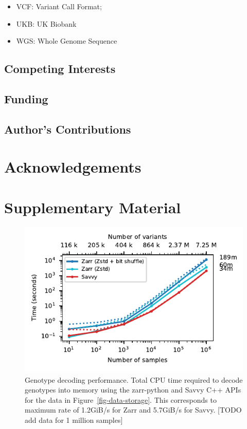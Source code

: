 \documentclass[a4paper,num-refs]{oup-contemporary}
\begin{document}
\begin{itemize}
    \item VCF: Variant Call Format;
    \item UKB: UK Biobank
    \item WGS: Whole Genome Sequence
\end{itemize}

\subsection{Competing Interests}
\subsection{Funding}

\subsection{Author's Contributions}

\section{Acknowledgements}




\clearpage
\renewcommand\thefigure{S\arabic{figure}}
\setcounter{figure}{0}
\renewcommand\thetable{S\arabic{table}}
\setcounter{table}{0}

\section*{Supplementary Material}

\begin{figure}
\includegraphics{figures/whole-matrix-decode}
\caption{Genotype decoding performance.
Total CPU time required to decode genotypes into memory using the zarr-python
and Savvy C++ APIs for the data in Figure~\ref{fig-data-storage}.
This corresponds to maximum rate of 1.2GiB/s for Zarr and 5.7GiB/s
for Savvy. [TODO add data for 1 million samples]
\label{fig-whole-matrix-decode}}
\end{figure}
\end{document}

